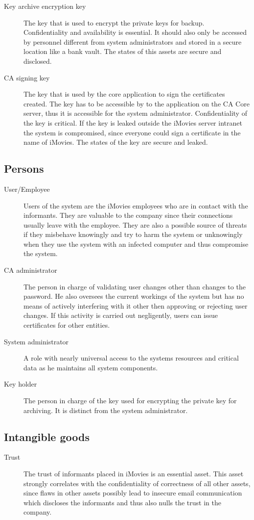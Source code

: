 \documentclass[a4paper, toc=index, 12pt, DIV14, twoside, BCOR2cm, headsepline, numbers=noenddot, bibliography=totoc]{report}
\begin{document}
\begin{description}
\item[Key archive encryption key] The key that is used to encrypt the private keys for backup. Confidentiality and availability is essential. It should also only be accessed by personnel different from system administrators and stored in a secure location like a bank vault. The states of this assets are secure and disclosed.
\item[CA signing key] The key that is used by the core application to sign the certificates created. The key has to be accessible by to the application on the CA Core server, thus it is accessible for the system administrator. Confidentiality of the key is critical. If the key is leaked outside the iMovies server intranet the system is compromised, since everyone could sign a certificate in the name of iMovies. The states of the key are secure and leaked.
\end{description}
\subsection{Persons}
\begin{description}
\item[User/Employee ] Users of the system are the iMovies employees who are in contact with the informants. They are valuable to the company since their connections usually leave with the employee. They are also a possible source of threats if they misbehave knowingly and try to harm the system or unknowingly when they use the system with an infected computer and thus compromise the system.
\item[CA administrator ] The person in charge of validating user changes other than changes to the password. He also oversees the current workings of the system but has no means of actively interfering with it other then approving or rejecting user changes. If this activity is carried out negligently, users can issue certificates for other entities.
\item[System administrator ] A role with nearly universal access to the systems resources and critical data as he maintains all system components.
\item[Key holder ] The person in charge of the key used for encrypting the private key for archiving. It is distinct from the system administrator.
\end{description}

\subsection{Intangible goods}
\begin{description}
\item[Trust ] The trust of informants placed in iMovies is an essential asset. This asset strongly correlates with the confidentiality of correctness of all other assets, since flaws in other assets possibly lead to insecure email communication which discloses the informants and thus also nulls the trust in the company.
\end{description}
\end{document}
